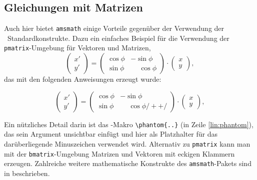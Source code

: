 \subsection{Gleichungen mit Matrizen}

Auch hier bietet \texttt{amsmath} einige Vorteile gegenüber der Verwendung der \latex\ Standardkonstrukte. Dazu ein einfaches Beispiel für die Verwendung der \texttt{pmatrix}-Umgebung für Vektoren und Matrizen,
%
\begin{equation}
	\begin{pmatrix} x' \\ y' \end{pmatrix}
	= 
	\begin{pmatrix}
	  \cos \phi & -\sin \phi \\
	  \sin \phi & \phantom{-}\cos \phi
	\end{pmatrix} 
	\cdot
	\begin{pmatrix}	x \\ y \end{pmatrix} ,
\end{equation}
%
das mit den folgenden Anweisungen erzeugt wurde:
%
\begin{LaTeXCode}[numbers=none]
\begin{equation}
	\begin{pmatrix} 
			x' \\ 
			y' 
	\end{pmatrix}
	= 
	\begin{pmatrix}
		  \cos \phi & -\sin \phi \\
		  \sin \phi & \phantom{-}\cos \phi /+ \label{lin:phantom} +/
	\end{pmatrix} 
	\cdot
	\begin{pmatrix} 
			x \\ 
			y 
	\end{pmatrix} ,
\end{equation}
\end{LaTeXCode}
%
Ein nützliches Detail darin ist das \tex-Makro \verb!\phantom{..}! (in Zeile \ref{lin:phantom}), das sein Argument unsichtbar einfügt und hier als Platzhalter für das darüberliegende Minuszeichen verwendet wird. Alternativ zu \texttt{pmatrix} kann man mit der \texttt{bmatrix}-Umgebung Matrizen
und Vektoren mit eckigen Klammern erzeugen.
Zahlreiche weitere mathematische Konstrukte des \texttt{amsmath}-Pakets sind in \cite{amsldoc02} beschrieben.

